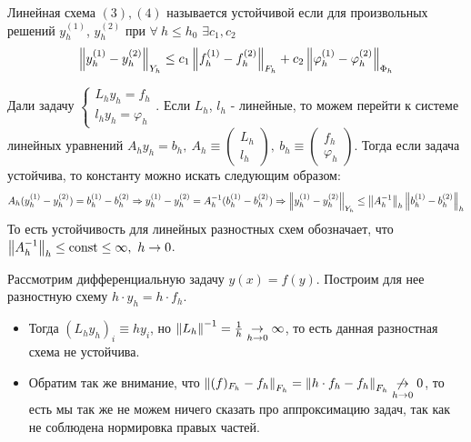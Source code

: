 \begin{definition}
  Линейная схема $(3),(4)$ называется устойчивой если
  для произвольных решений $y_h^{(1)}$, $y_h^{(2)}$ при $\forall\ h\leq h_0$ $\exists c_1,c_2$
  \[\left\lVert y_h^{(1)}-y_h^{(2)}\right\rVert_{Y_h}\leq c_1\left\lVert f_h^{(1)}-f_h^{(2)}\right\rVert_{F_h} +c_2 \left\lVert\varphi_h^{(1)}-\varphi_h^{(2)}\right\rVert_{\Phi_h}\]
\end{definition}

\begin{remark}
  Дали задачу $\begin{cases}
      L_hy_h=f_h \\ l_hy_h=\varphi_h
    \end{cases}$. Если $L_h$, $l_h$ - линейные, то можем перейти к системе
  линейных уравнений $A_hy_h=b_h,\ A_h\equiv\left(\begin{array}{c}
        L_h \\ l_h
      \end{array}\right),\ b_h\equiv\left(\begin{array}{c}
        f_h \\ \varphi_h
      \end{array}\right)$. Тогда если задача устойчива, то константу можно искать
  следующим образом:
  \[A_h(y_h^{(1)}-y_h^{(2)})=b_h^{(1)}-b_h^{(2)}\Rightarrow y_h^{(1)}-y_h^{(2)}=A_h^{-1}(b_h^{(1)}-b_h^{(2)})\Rightarrow\left\lVert y_h^{(1)}-y_h^{(2)}\right\rVert_{Y_h}\leq\left\lVert A^{-1}_h\right\rVert_h\left\lVert b_h^{(1)}-b_h^{(2)}\right\rVert_h\]
  То есть устойчивость для линейных разностных схем обозначает, что $\norm{A^{-1}_h}_h\leq \const\leq\infty,\ h\rightarrow0$.
\end{remark}

\begin{example*}
  Рассмотрим дифференциальную задачу $y(x)=f(y)$.
  Построим для нее разностную схему $h\cdot y_h=h\cdot f_h$.
  \begin{itemize}
    \item Тогда $(L_hy_h)_i\equiv hy_i$, но $\left\lVert L_h\right\rVert^{-1}=\frac{1}{h}\underset{h\rightarrow0}{\rightarrow}\infty$,
          то есть данная разностная схема не устойчива.
    \item Обратим так же внимание, что $\left\lVert(f)_{F_h}-f_h\right\rVert_{F_h}=\left\lVert h\cdot f_h-f_h\right\rVert_{F_h}\underset{h\rightarrow0}{\not\rightarrow}0$, то
          есть мы так же не можем ничего сказать про аппроксимацию задач, так как не соблюдена нормировка правых частей.
  \end{itemize}
\end{example*}

